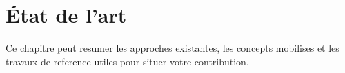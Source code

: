 \chapter{\'Etat de l'art}

Ce chapitre peut resumer les approches existantes, les concepts mobilises et les
travaux de reference utiles pour situer votre contribution.
